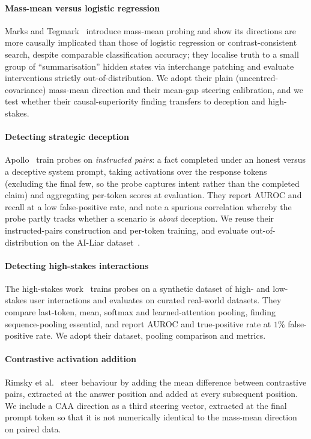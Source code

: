 \documentclass[conference]{IEEEtran}
\begin{document}
\paragraph{Mass-mean versus logistic regression}
Marks and Tegmark~\cite{marks2024} introduce mass-mean probing and show its
directions are more causally implicated than those of logistic regression or
contrast-consistent search, despite comparable classification accuracy; they
localise truth to a small group of ``summarisation'' hidden states via
interchange patching and evaluate interventions strictly out-of-distribution.
We adopt their plain (uncentred-covariance) mass-mean direction and their
mean-gap steering calibration, and we test whether their causal-superiority
finding transfers to deception and high-stakes.

\paragraph{Detecting strategic deception}
Apollo~\cite{goldowsky2025} train probes on \emph{instructed pairs}: a fact
completed under an honest versus a deceptive system prompt, taking activations
over the response tokens (excluding the final few, so the probe captures intent
rather than the completed claim) and aggregating per-token scores at
evaluation. They report AUROC and recall at a low false-positive rate, and note
a spurious correlation whereby the probe partly tracks whether a scenario is
\emph{about} deception. We reuse their instructed-pairs construction and
per-token training, and evaluate out-of-distribution on the AI-Liar
dataset~\cite{pacchiardi2024}.

\paragraph{Detecting high-stakes interactions}
The high-stakes work~\cite{mckenzie2025} trains probes on a synthetic dataset of
high- and low-stakes user interactions and evaluates on curated real-world
datasets. They compare last-token, mean, softmax and learned-attention pooling,
finding sequence-pooling essential, and report AUROC and true-positive rate at
$1\%$ false-positive rate. We adopt their dataset, pooling comparison and
metrics.

\paragraph{Contrastive activation addition}
Rimsky et al.~\cite{rimsky2024} steer behaviour by adding the mean difference
between contrastive pairs, extracted at the answer position and added at every
subsequent position. We include a CAA direction as a third steering vector,
extracted at the final prompt token so that it is not numerically identical to
the mass-mean direction on paired data.
\end{document}
